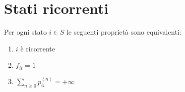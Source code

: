 \documentclass[\main/main.tex]{subfiles}
\begin{document}
\section{Stati ricorrenti}
\begin{theorem}
  Per ogni stato \(i \in S\) le seguenti proprietà sono equivalenti:
  \begin{enumerate}
    \item \(i\) è ricorrente
    \item \(f_{ii} = 1\)
    \item \(\sum_{n \geq 0}p^{(n)}_{ii} = + \infty \)
  \end{enumerate}
\end{theorem}
\end{document}
